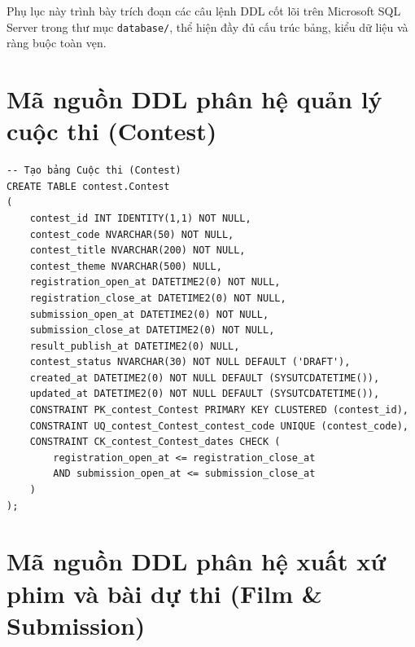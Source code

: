 
Phụ lục này trình bày trích đoạn các câu lệnh DDL cốt lõi trên Microsoft SQL Server trong thư mục \texttt{database/}, thể hiện đầy đủ cấu trúc bảng, kiểu dữ liệu và ràng buộc toàn vẹn.

\section{Mã nguồn DDL phân hệ quản lý cuộc thi (Contest)}
\label{a:ddl_contest}

\begin{verbatim}
-- Tạo bảng Cuộc thi (Contest)
CREATE TABLE contest.Contest
(
    contest_id INT IDENTITY(1,1) NOT NULL,
    contest_code NVARCHAR(50) NOT NULL,
    contest_title NVARCHAR(200) NOT NULL,
    contest_theme NVARCHAR(500) NULL,
    registration_open_at DATETIME2(0) NOT NULL,
    registration_close_at DATETIME2(0) NOT NULL,
    submission_open_at DATETIME2(0) NOT NULL,
    submission_close_at DATETIME2(0) NOT NULL,
    result_publish_at DATETIME2(0) NULL,
    contest_status NVARCHAR(30) NOT NULL DEFAULT ('DRAFT'),
    created_at DATETIME2(0) NOT NULL DEFAULT (SYSUTCDATETIME()),
    updated_at DATETIME2(0) NOT NULL DEFAULT (SYSUTCDATETIME()),
    CONSTRAINT PK_contest_Contest PRIMARY KEY CLUSTERED (contest_id),
    CONSTRAINT UQ_contest_Contest_contest_code UNIQUE (contest_code),
    CONSTRAINT CK_contest_Contest_dates CHECK (
        registration_open_at <= registration_close_at 
        AND submission_open_at <= submission_close_at
    )
);
\end{verbatim}

\section{Mã nguồn DDL phân hệ xuất xứ phim và bài dự thi (Film \& Submission)}
\label{a:ddl_film_submission}

